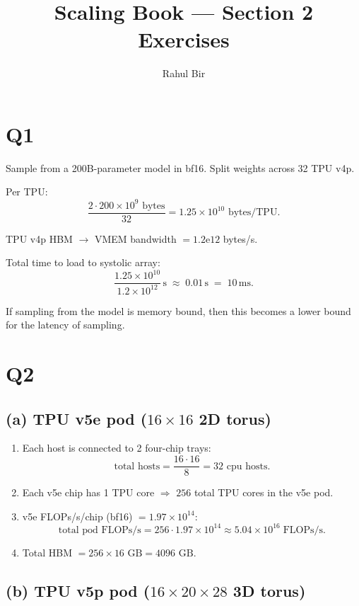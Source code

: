 \documentclass[11pt]{article}
\title{Scaling Book --- Section 2 Exercises}
\author{Rahul Bir}
\date{}
\newcommand{\flopss}{\text{FLOPs/s}}
\begin{document}
\maketitle

\section*{Q1}

Sample from a 200B-parameter model in bf16. Split weights across 32 TPU v4p.

Per TPU:
\[
\frac{2 \cdot 200 \times 10^9 \text{ bytes}}{32} = 1.25 \times 10^{10} \text{ bytes/TPU}.
\]

TPU v4p HBM $\to$ VMEM bandwidth $= 1.2\mathrm{e}12$ bytes/s.

Total time to load to systolic array:
\[
\frac{1.25 \times 10^{10}}{1.2 \times 10^{12}} \,\text{s} \;\approx\; 0.01\,\text{s} \;=\; 10\,\text{ms}.
\]

If sampling from the model is memory bound, then this becomes a lower bound for the latency of sampling.

\section*{Q2}

\subsection*{(a) TPU v5e pod ($16 \times 16$ 2D torus)}

\begin{enumerate}[label=(\roman*)]
  \item Each host is connected to 2 four-chip trays:
  \[
  \text{total hosts} = \frac{16 \cdot 16}{8} = 32 \text{ cpu hosts}.
  \]
  \item Each v5e chip has 1 TPU core $\Rightarrow$ $256$ total TPU cores in the v5e pod.
  \item v5e FLOPs/s/chip (bf16) $= 1.97 \times 10^{14}$:
  \[
  \text{total pod } \flopss = 256 \cdot 1.97 \times 10^{14} \approx 5.04 \times 10^{16} \; \flopss.
  \]
  \item Total HBM $= 256 \times 16 \text{ GB} = 4096 \text{ GB}$.
\end{enumerate}

\subsection*{(b) TPU v5p pod ($16 \times 20 \times 28$ 3D torus)}
\end{document}
